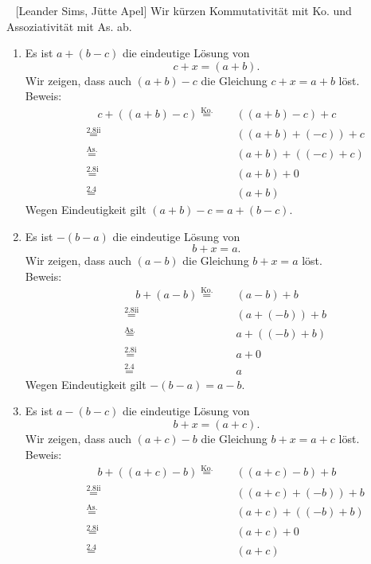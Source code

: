 \begin{lsg}\mbox{ }
[Leander Sims, Jütte Apel]
Wir kürzen Kommutativität mit Ko. und Assoziativität mit As. ab.
\begin{enumerate}[label=$\mathrm{(\roman*)}$, ref=$\mathrm{\roman*}$]
\item
    Es ist $ a+(b-c) $ die eindeutige L\"osung von 
    \[c+x =(a+b).\]
    Wir zeigen, dass auch $(a+b)-c$ die Gleichung $c+x =a+b$ l\"ost.\\
    Beweis:
    \begin{align*}
	    && \quad  c+((a+b)-c) \overset{\text{Ko.}}{=} & \quad ((a+b)-c)+c\\
    	&&\overset{\text{2.8ii}}{=} & \quad ((a+b)+(-c))+c\\
	    &&\overset{\text{As.}}{=} & \quad (a+b)+((-c)+c)\\
	    &&\overset{\text{2.8i}}{=} & \quad (a+b)+0\\
    	&&\overset{\text{2.4}}{=} & \quad (a+b)
\end{align*}
Wegen Eindeutigkeit gilt $(a+b)-c=a+(b-c)$.
\item
    Es ist $ -(b-a) $ die eindeutige L\"osung von 
    \[b+x =a.\]
	Wir zeigen, dass auch $(a-b)$ die Gleichung $b+x =a$ l\"ost.\\
	Beweis:
	\begin{align*}
		&& \quad  b+(a-b)\overset{\text{Ko.}}{=}& \quad  (a-b)+b\\
		&&\overset{\text{2.8ii}}{=} & \quad (a+(-b))+b\\
		&&\overset{\text{As.}}{=} & \quad a+((-b)+b)\\
		&&\overset{\text{2.8i}}{=} & \quad a +0\\
		&&\overset{\text{2.4}}{=} & \quad a
	\end{align*}
	Wegen Eindeutigkeit gilt $-(b-a)=a-b$.
\item
    Es ist $a-(b-c)$ die eindeutige L\"osung von 
	\[ b+x=(a+c). \]
	Wir zeigen, dass auch $(a+c)-b$ die Gleichung $b+x=a+c$ l\"ost.\\
	Beweis:
	\begin{align*}
		&& \quad b+((a+c)-b)\overset{\text{Ko.}}{=} & \quad ((a+c)-b)+b\\
		&&\overset{\text{2.8ii}}{=} & \quad ((a+c)+(-b))+b\\
		&&\overset{\text{As.}}{=} & \quad (a+c)+((-b)+b)\\
		&&\overset{\text{2.8i}}{=} & \quad (a+c)+0\\
		&&\overset{\text{2.4}}{=} & \quad (a+c)
	\end{align*}\\

\end{enumerate}
\end{lsg}
